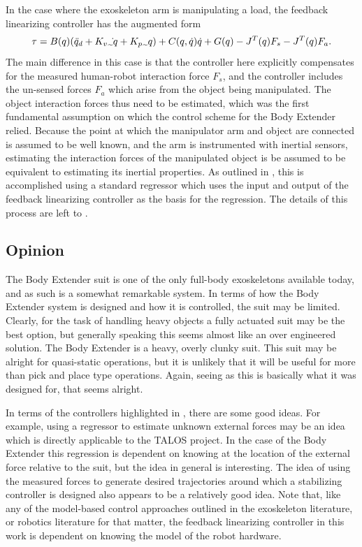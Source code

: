 In the case where the exoskeleton arm is manipulating a load, the feedback linearizing controller has the augmented form
\begin{equation}
\tau = B(q)(\ddot{q}_d + K_v \dot{\tilde{q}} + K_p \tilde{q}) + C(q,\dot{q})\dot{q} + G(q) -J^T(q) F_s -J^T(q)F_a. \notag
\end{equation}
The main difference in this case is that the controller here explicitly compensates for the measured human-robot interaction force $F_s$, and the controller includes the un-sensed forces $F_a$ which arise from the object being manipulated.  The object interaction forces thus need to be estimated, which was the first fundamental assumption on which the control scheme for the Body Extender relied.  Because the point at which the manipulator arm and object are connected is assumed to be well known, and the arm is instrumented with inertial sensors, estimating the interaction forces of the manipulated object is be assumed to be equivalent to estimating its inertial properties.  As outlined in \cite{}, this is accomplished using a standard regressor which uses the input and output of the feedback linearizing controller as the basis for the regression.  The details of this process are left to \cite{}.

 
\subsection{Opinion}

The Body Extender suit is one of the only full-body exoskeletons available today, and as such is a somewhat remarkable system. In terms of how the Body Extender system is designed and how it is controlled, the suit may be limited. Clearly, for the task of handling heavy objects a fully actuated suit may be the best option, but generally speaking this seems almost like an over engineered solution.  The Body Extender is a heavy, overly clunky suit.  This suit may be alright for quasi-static operations, but it is unlikely that it will be useful for more than pick and place type operations.  Again, seeing as this is basically what it was designed for, that seems alright.

In terms of the controllers highlighted in \cite{}, there are some good ideas.  For example, using a regressor to estimate unknown external forces may be an idea which is directly applicable to the TALOS project.  In the case of the Body Extender this regression is dependent on knowing at the location of the external force  relative to the suit, but the idea in general is interesting.  The idea of using the measured forces to generate desired trajectories around which a stabilizing controller is designed also appears to be a relatively good idea.  Note that, like any of the model-based control approaches outlined in the exoskeleton literature, or robotics literature for that matter, the feedback linearizing controller in this work is dependent on knowing the model of the robot hardware.  

